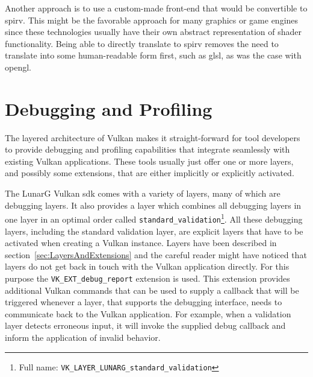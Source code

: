    Another approach is to use a custom-made front-end that would be convertible to \gls{spirv}.
    This might be the favorable approach for many graphics or game engines since these technologies usually have their own abstract representation of shader functionality.
    Being able to directly translate to \gls{spirv} removes the need to translate into some human-readable form first, such as \gls{glsl}, as was the case with \gls{opengl}.


  \section{Debugging and Profiling}
  \label{sec:DebuggingAndProfiling}
    The layered architecture of Vulkan makes it straight-forward for tool developers to provide debugging and profiling capabilities that integrate seamlessly with existing Vulkan applications.
    These tools usually just offer one or more layers, and possibly some extensions, that are either implicitly or explicitly activated.

    The LunarG Vulkan \gls{sdk} comes with a variety of layers, many of which are debugging layers.
    It also provides a layer which combines all debugging layers in one layer in an optimal order called \lstinline{standard_validation}\footnote{Full name: \lstinline{VK_LAYER_LUNARG_standard_validation}}.
    All these debugging layers, including the standard validation layer, are explicit layers that have to be activated when creating a Vulkan instance.
    Layers have been described in section~\ref{sec:LayersAndExtensions} and the careful reader might have noticed that layers do not get back in touch with the Vulkan application directly.
    For this purpose the \lstinline{VK_EXT_debug_report} extension is used.
    This extension provides additional Vulkan commands that can be used to supply a callback that will be triggered whenever a layer, that supports the debugging interface, needs to communicate back to the Vulkan application.
    For example, when a validation layer detects erroneous input, it will invoke the supplied debug callback and inform the application of invalid behavior.

